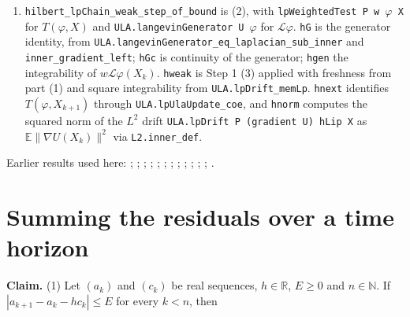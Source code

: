 \documentclass[11pt,a4paper]{article}
\begin{document}
\begin{leanbox}
\begin{enumerate}
\item \texttt{hilbert\_\allowbreak{}lp\allowbreak{}Chain\_\allowbreak{}weak\_\allowbreak{}step\_\allowbreak{}of\_\allowbreak{}bound} is (2), with \texttt{lp\allowbreak{}Weighted\allowbreak{}Test P w \ensuremath{\varphi} X} for \(T(\varphi,X)\) and \texttt{ULA.\allowbreak{}langevin\allowbreak{}Generator U \ensuremath{\varphi}} for \(\mathcal L\varphi\). \texttt{h\allowbreak{}G} is the generator identity, from \texttt{ULA.\allowbreak{}langevin\allowbreak{}Generator\_\allowbreak{}eq\_\allowbreak{}laplacian\_\allowbreak{}sub\_\allowbreak{}inner} and \texttt{inner\_\allowbreak{}gradient\_\allowbreak{}left}; \texttt{h\allowbreak{}Gc} is continuity of the generator; \texttt{hgen} the integrability of \(w\mathcal L\varphi(X_k)\). \texttt{hweak} is Step 1 (3) applied with freshness from part (1) and square integrability from \texttt{ULA.\allowbreak{}lp\allowbreak{}Drift\_\allowbreak{}mem\allowbreak{}Lp}. \texttt{hnext} identifies \(T(\varphi,X_{k+1})\) through \texttt{ULA.\allowbreak{}lp\allowbreak{}Ula\allowbreak{}Update\_\allowbreak{}coe}, and \texttt{hnorm} computes the squared norm of the \(L^2\) drift \texttt{ULA.\allowbreak{}lp\allowbreak{}Drift P (gradient U) h\allowbreak{}Lip X} as \(\mathbb E\|\nabla U(X_k)\|^2\) via \texttt{L2.\allowbreak{}inner\_\allowbreak{}def}.

\end{enumerate}
\end{leanbox}


Earlier results used here: \cite[Section~3.13.11]{LangevinLean2026ULASC}; \cite[Section~3.13.12]{LangevinLean2026ULASC}; \cite[Section~3.13.2]{LangevinLean2026ULASC}; \cite[Section~3.13.3]{LangevinLean2026ULASC}; \cite[Section~3.13.4]{LangevinLean2026ULASC}; \cite[Section~3.19.1]{LangevinLean2026ULASC}; \cite[Section~3.20.1]{LangevinLean2026ULASC}; \cite[Section~3.23.1]{LangevinLean2026ULASC}; \cite[Section~3.23.2]{LangevinLean2026ULASC}; \cite[Section~3.42.1]{LangevinLean2026ULASC}; \cite[Section~3.46.14]{LangevinLean2026ULASC}; \cite[Section~3.46.2]{LangevinLean2026ULASC}; \cite[Section~3.46.8]{LangevinLean2026ULASC}.

\section{\texorpdfstring{Summing the residuals over a time horizon}{Summing the residuals over a time horizon}}


\textbf{Claim.} (1) Let \((a_k)\) and \((c_k)\) be real sequences, \(h\in\mathbb R\), \(E\ge0\) and \(n\in\mathbb N\). If \(|a_{k+1}-a_k-hc_k|\le E\) for every \(k<n\), then
\end{document}
